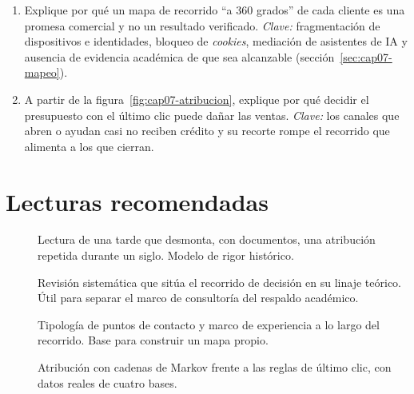 \begin{enumerate}
  \item Explique por qué un mapa de recorrido \enquote{a 360 grados} de cada
  cliente es una promesa comercial y no un resultado verificado.
  \textit{Clave:} fragmentación de dispositivos e identidades, bloqueo de
  \textit{cookies}, mediación de asistentes de IA y ausencia de evidencia
  académica de que sea alcanzable (sección~\ref{sec:cap07-mapeo}).
  \item A partir de la figura~\ref{fig:cap07-atribucion}, explique por qué
  decidir el presupuesto con el último clic puede dañar las ventas.
  \textit{Clave:} los canales que abren o ayudan casi no reciben crédito y
  su recorte rompe el recorrido que alimenta a los que cierran.
\end{enumerate}

\section{Lecturas recomendadas}

\begin{description}
  \item[\textcite{iwamoto2024origenaida}] Lectura de una tarde que desmonta, con documentos, una atribución repetida durante un siglo. Modelo de rigor histórico.
  \item[\textcite{santos2021consumer}] Revisión sistemática que sitúa el recorrido de decisión en su linaje teórico. Útil para separar el marco de consultoría del respaldo académico.
  \item[\textcite{lemon2016}] Tipología de puntos de contacto y marco de experiencia a lo largo del recorrido. Base para construir un mapa propio.
  \item[\textcite{anderl2016}] Atribución con cadenas de Markov frente a las reglas de último clic, con datos reales de cuatro bases.
\end{description}
